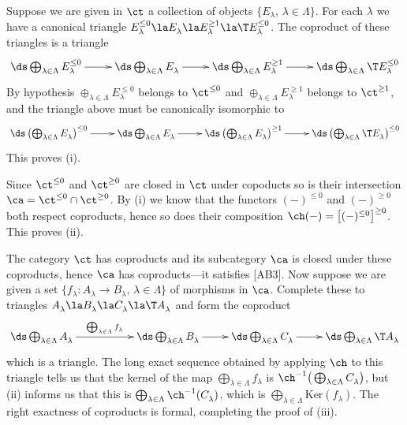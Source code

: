 \documentclass[11pt]{amsart}
\newcommand{\sr}{\rightarrow}
\begin{document}
\prf
Suppose we are given in $\ct$
a collection of objects $\{E_\lambda^{},\,\lambda\in\Lambda\}$. For
each $\lambda$ we have a canonical triangle
$E_\lambda^{\leq0}\la E_\lambda^{}\la E_\lambda^{\geq1}\la\T E_\lambda^{\leq0}$.
The coproduct of these triangles is a triangle
\[\xymatrix{
  \ds \bigoplus_{\lambda\in\Lambda}E_\lambda^{\leq0}
  \ar[r] &\ds \bigoplus_{\lambda\in\Lambda} E_\lambda^{}\ar[r]
  &\ds \bigoplus_{\lambda\in\Lambda} E_\lambda^{\geq1}
  \ar[r] &\ds \bigoplus_{\lambda\in\Lambda}\T E_\lambda^{\leq0}
}\]
By hypothesis $\oplus^{}_{\lambda\in\Lambda}E_\lambda^{\leq0}$
belongs to $\ct^{\leq0}$ and  $\oplus^{}_{\lambda\in\Lambda}E_\lambda^{\geq1}$
belongs to $\ct^{\geq1}$, and the triangle above
must be canonically isomorphic
to
\[\xymatrix{
  \ds \left(\bigoplus_{\lambda\in\Lambda}E_\lambda^{}\right)^{\leq0}
  \ar[r] &\ds \bigoplus_{\lambda\in\Lambda} E_\lambda^{}\ar[r]
  &\ds \left(\bigoplus_{\lambda\in\Lambda} E_\lambda^{}\right)^{\geq1}
  \ar[r] &\ds \left(\bigoplus_{\lambda\in\Lambda}\T E_\lambda^{}\right)^{\leq0}
}\]
This proves (i).

Since $\ct^{\leq0}$ and $\ct^{\geq0}$ are closed in $\ct$ under copoducts
so is their intersection $\ca=\ct^{\leq0}\cap\ct^{\geq0}$. By (i) we know that
the functors $(-)^{\leq0}$ and $(-)^{\geq0}$ both
respect coproducts, hence so does their
composition $\ch(-)=\big[(-)^{\leq0}\big]^{\geq0}$. This proves (ii).

The category $\ct$ has coproducts and its subcategory $\ca$ is closed
under these coproducts, hence $\ca$ has coproducts---it satisfies
[AB3]. Now suppose we are given a set
$\{f_\lambda^{}:A_\lambda^{}\sr B_\lambda^{},\,\lambda\in\Lambda\}$
of morphisms
in $\ca$. Complete these to triangles
$A_\lambda^{}\la B_\lambda^{}\la C_\lambda^{}\la\T A_\lambda^{}$ and form
the coproduct
\[\xymatrix{
  \ds\bigoplus_{\lambda\in\Lambda}A_\lambda^{}
  \ar[rr]^-{\bigoplus_{\lambda\in\Lambda}f_\lambda^{}} & &
 \ds\bigoplus_{\lambda\in\Lambda}B_\lambda^{}
  \ar[r] &
 \ds\bigoplus_{\lambda\in\Lambda}C_\lambda^{}
 \ar[r] &
  \ds\bigoplus_{\lambda\in\Lambda}\T A_\lambda^{}
}\]
which is a triangle. The long exact sequence obtained by
applying $\ch$
to this triangle tells us that the kernel
of the map $\bigoplus_{\lambda\in\Lambda}^{}f_\lambda^{}$ is
$\ch^{-1}\big(\bigoplus_{\lambda\in\Lambda}^{}C_\lambda^{}\big)$,
but (ii) informs us that this is
$\bigoplus_{\lambda\in\Lambda}^{}\ch^{-1}(C_\lambda^{})$, which
is $\bigoplus_{\lambda\in\Lambda}^{}\mathrm{Ker}(f_\lambda^{})$.
The right exactness of coproducts is formal,
 completing the proof of (iii).
\end{document}

